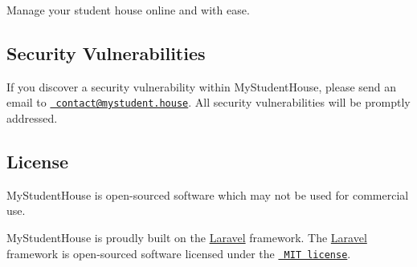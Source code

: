 Manage your student house online and with ease.

\subsection*{Security Vulnerabilities}

If you discover a security vulnerability within My\+Student\+House, please send an email to \href{mailto:contact@mystudent.house}{\texttt{ contact@mystudent.\+house}}. All security vulnerabilities will be promptly addressed.

\subsection*{License}

My\+Student\+House is open-\/sourced software which may not be used for commercial use.

My\+Student\+House is proudly built on the \mbox{\hyperlink{namespace_laravel}{Laravel}} framework. The \mbox{\hyperlink{namespace_laravel}{Laravel}} framework is open-\/sourced software licensed under the \href{https://opensource.org/licenses/MIT}{\texttt{ M\+IT license}}. 
